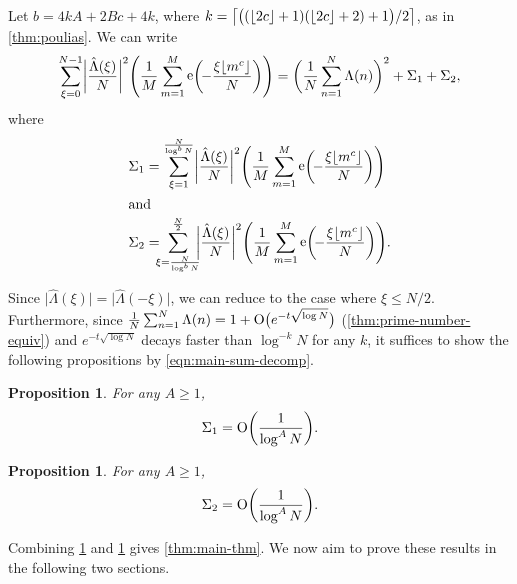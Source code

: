 \documentclass[letterpaper, 12pt]{article}
\theoremstyle{plain}
\newtheorem{Proposition}[Theorem]{Proposition}
\theoremstyle{definition}
\theoremstyle{plain}
\theoremstyle{plain}
\numberwithin{equation}{section}
\newcommand{\Oh}{{\rm O}}
\renewcommand{\leq}{\leqslant}
\renewcommand{\geq}{\geqslant}
\newcommand{\1}{\textbf{1}}
\DeclarePairedDelimiter\ceil{\lceil}{\rceil}
\DeclarePairedDelimiter\floor{\lfloor}{\rfloor}
\DeclareMathOperator{\e}{e}
\begin{document}
Let $b = 4kA + 2Bc + 4k$, where $k = \ceil*{\bigl((\floor{2c} + 1)(\floor{2c} + 2) + 1 \bigr)/2}$, as in \cref{thm:poulias}. We can write
\begin{equation}\label{eqn:main-sum-decomp}
    \sum_{\xi = 0}^{N - 1} \biggl\lvert \frac{\hat{\Lambda}(\xi)}{N} \biggr\rvert^2 \Biggl(\frac{1}{M} \sum_{m = 1}^M \e\biggl(\! -\frac{\xi \floor{m^c}}{N} \biggr)\Biggr) 
    = \biggl(\frac{1}{N} \sum_{n = 1}^N \Lambda(n) \biggr)^2 + \Sigma_1 + \Sigma_2,
\end{equation}
where
\begin{align*}
    \Sigma_1 &= \sum_{\xi = 1}^{\frac{N}{\log^b N}} \biggl\lvert \frac{\hat{\Lambda}(\xi)}{N} \biggr\rvert^2 \Biggl(\frac{1}{M} \sum_{m=1}^M \e\biggl(\! -\frac{\xi \floor{m^c}}{N} \biggr)\Biggr)\\
\intertext{and} 
    \Sigma_2 &= \mkern-10mu \sum_{\xi = \frac{N}{\log^b N}}^{\frac{N}{2}} \!\! \biggl\lvert \frac{\hat{\Lambda}(\xi)}{N} \biggr\rvert^2 \Biggl(\frac{1}{M} \sum_{m=1}^M \e\biggl(\! -\frac{\xi \floor{m^c}}{N} \biggr)\Biggr).
\end{align*}

Since $\lvert \hat{\Lambda}(\xi) \rvert = \lvert \hat{\Lambda}(-\xi) \rvert$, we can reduce to the case where $\xi \leq N/2$. Furthermore, since $\frac{1}{N} \sum_{n = 1}^{N} \Lambda(n) = 1 + \Oh \bigl(e^{-t \sqrt{\log N}} \bigr)$ (\cref{thm:prime-number-equiv}) and $e^{-t \sqrt{\log N}}$ decays faster than $\log^{-k} N$ for any $k$, it suffices to show the following propositions by \cref{eqn:main-sum-decomp}.

\begin{Proposition}\label{prop:estimate-sigma1}
    For any \(A \geq 1\),
    \[
        \Sigma_1 = \Oh\biggl(\frac{1}{\log^A N} \biggr).
    \]
\end{Proposition}

\begin{Proposition}\label{prop:estimate-sigma2}
    For any \(A \geq 1\),
    \[
        \Sigma_2 = \Oh\biggl(\frac{1}{\log^A N} \biggr).
    \]
\end{Proposition}

Combining \cref{prop:estimate-sigma1} and \cref{prop:estimate-sigma2} gives \cref{thm:main-thm}. We now aim to prove these results in the following two sections.

\end{document}
